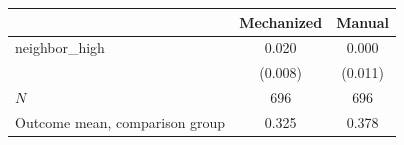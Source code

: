 \begin{tabular}{lcc}
\hline\hline
 & Mechanized & Manual \\
\hline
neighbor_high & 0.020 & 0.000 \\
 & (0.008) & (0.011) \\
\hline
$N$ & 696 & 696 \\
Outcome mean, comparison group & 0.325 & 0.378 \\
\hline\hline
\end{tabular}
